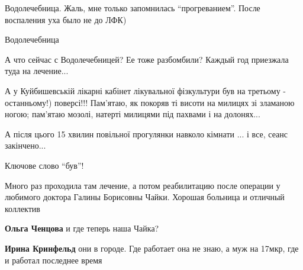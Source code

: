  
 
 
 
 

\qqSecCmt


Водолечебница. Жаль, мне только запомнилась \enquote{прогреванием}. После воспаления уха было не до ЛФК)


Водолечебница🙁💔


А что сейчас с Водолечебницей? Ее тоже разбомбили? Каждый год приезжала туда на
лечение...


А у Куйбишевській лікарні кабінет лікувальної фізкультури був на третьому -
останньому!) поверсі!!! Пам'ятаю, як покоряв ті висоти на милицях зі зламаною
ногою; пам'ятаю мозолі, натерті милицями під пахвами і на долонях...

А після цього 15 хвилин повільної прогулянки навколо кімнати ... і все, сеанс
закінчено...


Ключове слово \enquote{був}!


Много раз проходила там лечение, а потом реабилитацию после операции у любимого
доктора Галины Борисовны Чайки. Хорошая больница и отличный коллектив

\begin{itemize} %
\textbf{Ольга Ченцова} и где теперь наша Чайка?

\textbf{Ирина Кринфельд} они в городе. Где работает она не знаю, а муж на 17мкр, где и работал последнее время
\end{itemize} %
